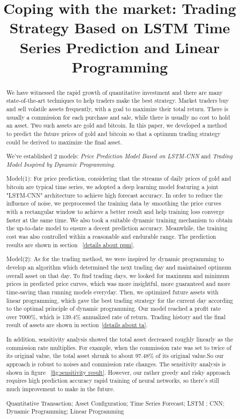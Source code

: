 \documentclass{mcmthesis}
\title{Coping with the market: Trading Strategy Based on LSTM Time Series Prediction and Linear Programming}
\begin{document}
\begin{abstract}    

We have witnessed the rapid growth of quantitative investment and there are many state-of-the-art techniques to help traders make the best strategy. Market traders buy and sell volatile assets frequently, with a goal to maximize their total return. There is usually a commission for each purchase and sale, while there is usually no cost to hold an asset. Two such assets are gold and bitcoin. In this paper, we developed a method to predict the future prices of gold and bitcoin so that a optimum trading strategy could be derived to maximize the final asset. 


We've established 2 models: \emph{Price Prediction Model Based on LSTM-CNN} and \emph{Trading Model Inspired by Dynamic Programming}.

Model(1): For price prediction, considering that the streams of daily prices of gold and bitcoin are typical time series, we adopted a deep learning model featuring a joint "LSTM-CNN" architecture to achieve high forecast accuracy. In order to reduce the influence of noise, we preprocessed the training data by smoothing the price curves with a rectangular window to achieve a better result and help training loss converge faster at the same time. We also took a suitable dynamic training mechanism to obtain the up-to-date model to ensure a decent prediction accuracy. Meanwhile, the training cost was also controlled within a reasonable and endurable range. The prediction results are shown in section ~\ref{details about ppm}.


Model(2): As for the trading method, we were inspired by dynamic programming to develop an algorithm which determined the next trading day and maintained optimum overall asset on that day. To find trading days, we looked for maximum and minimum prices in predicted price curves, which was more insightful, more guaranteed and more time-saving than running models everyday. Then, we optimized future assets with linear programming, which gave the best trading strategy for the current day according to the optimal principle of dynamic programming. Our model reached a profit rate over 7000\%, which is 139.4\% annualized rate of return. Trading history and the final result of assets are shown in section~\ref{details about ta}.


In addition, sensitivity analysis showed the total asset decreased roughly linearly as the commission rate multiplies. For example, when the commission rate was set to twice of its original value, the total asset shrunk to about 97.48\% of its original value.So our approach is robust to noises and commission rate changes. The sensitivity analysis is shown in figure ~\ref{fig:sensitivity result}. However, our rather greedy and risky approach requires high prediction accuracy rapid training of neural networks, so there's still much improvement to make in the future.


\begin{keywords}
Quantitative Transaction; Asset Configuration; Time Series Forecast; LSTM ; CNN; Dynamic Programming; Linear Programming
\end{keywords}
\end{abstract}
\end{document}
